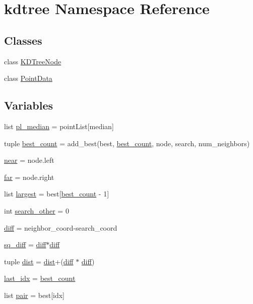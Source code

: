 \hypertarget{namespacekdtree}{
\section{kdtree Namespace Reference}
\label{namespacekdtree}
}
\subsection*{Classes}
\begin{DoxyCompactItemize}
\item 
class \hyperlink{classkdtree_1_1KDTreeNode}{KDTreeNode}
\item 
class \hyperlink{classkdtree_1_1PointData}{PointData}
\end{DoxyCompactItemize}
\subsection*{Variables}
\begin{DoxyCompactItemize}
\item 
list \hyperlink{namespacekdtree_a68dd1b5c2ca51036f48cfb773ef665ac}{pl\_\-median} = pointList\mbox{[}median\mbox{]}
\item 
tuple \hyperlink{namespacekdtree_a5254def45bf553b4ed113993acde66ec}{best\_\-count} = add\_\-best(best, \hyperlink{namespacekdtree_a5254def45bf553b4ed113993acde66ec}{best\_\-count}, node, search, num\_\-neighbors)
\item 
\hyperlink{namespacekdtree_a0ba21301aea56f1c2ef165f16bcc6af6}{near} = node.left
\item 
\hyperlink{namespacekdtree_a1098829259a7546f7778cfe19c86e50c}{far} = node.right
\item 
list \hyperlink{namespacekdtree_a8ae4f604fa3b331f0e1857ef7988dbed}{largest} = best\mbox{[}\hyperlink{namespacekdtree_a5254def45bf553b4ed113993acde66ec}{best\_\-count} -\/ 1\mbox{]}
\item 
int \hyperlink{namespacekdtree_a697ad02b362c4958d0497573757a329a}{search\_\-other} = 0
\item 
\hyperlink{namespacekdtree_acdecd5b85843a2d9caa9703f3d246c5a}{diff} = neighbor\_\-coord-\/search\_\-coord
\item 
\hyperlink{namespacekdtree_aa6b03574baf9af70ad70c383f1276f53}{sq\_\-diff} = \hyperlink{namespacekdtree_acdecd5b85843a2d9caa9703f3d246c5a}{diff}$\ast$\hyperlink{namespacekdtree_acdecd5b85843a2d9caa9703f3d246c5a}{diff}
\item 
tuple \hyperlink{namespacekdtree_ab18cecee0f3d4292dc06665f88c9dcd1}{dist} = \hyperlink{namespacekdtree_ab18cecee0f3d4292dc06665f88c9dcd1}{dist}+(\hyperlink{namespacekdtree_acdecd5b85843a2d9caa9703f3d246c5a}{diff} $\ast$ \hyperlink{namespacekdtree_acdecd5b85843a2d9caa9703f3d246c5a}{diff})
\item 
\hyperlink{namespacekdtree_a0e2b4f0710247ad4a1bc44217b669f98}{last\_\-idx} = \hyperlink{namespacekdtree_a5254def45bf553b4ed113993acde66ec}{best\_\-count}
\item 
list \hyperlink{namespacekdtree_a2c9210668756589c874996518e7c43dc}{pair} = best\mbox{[}idx\mbox{]}
\end{DoxyCompactItemize}


